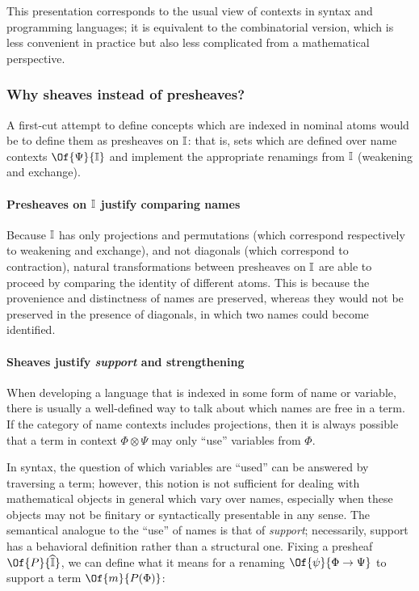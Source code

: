 \documentclass{article}
\newcommand\Psh[1]{\widehat{#1}}
\begin{document}
This presentation corresponds to the usual view of contexts in syntax
and programming languages; it is equivalent to the combinatorial
version, which is less convenient in practice but also less
complicated from a mathematical perspective.

\subsubsection{Why sheaves instead of presheaves?}

A first-cut attempt to define concepts which are indexed in nominal
atoms would be to define them as presheaves on $\mathbb{I}$: that
is, sets which are defined over name contexts $\Of{\Psi}{\CatI}$ and
implement the appropriate renamings from $\mathbb{I}$ (weakening and exchange).

\paragraph{Presheaves on $\mathbb{I}$ justify comparing names}
Because $\mathbb{I}$ has only projections and permutations (which
correspond respectively to weakening and exchange), and not diagonals
(which correspond to contraction), natural transformations between
presheaves on $\mathbb{I}$ are able to proceed by comparing the identity of
different atoms. This is because the provenience and distinctness of
names are preserved, whereas they would not be preserved in the
presence of diagonals, in which two names could become identified.

\paragraph{Sheaves justify \emph{support} and strengthening}

When developing a language that is indexed in some form of name
or variable, there is usually a well-defined way to talk about which
names are free in a term. If the category of name contexts
includes projections, then it is always possible that a term in
context $\Phi\otimes\Psi$ may only ``use'' variables from $\Phi$.

In syntax, the question of which variables are ``used'' can be
answered by traversing a term; however, this notion is not sufficient
for dealing with mathematical objects in general which vary over
names, especially when these objects may not be finitary or
  syntactically presentable in any sense.
%
The semantical analogue to the ``use'' of names is that of
\emph{support}; necessarily, support has a behavioral definition
rather than a structural one. Fixing a presheaf $\Of{P}{\Psh{\CatI}}$,
we can define what it means for a renaming $\Of{\psi}{\Phi\to\Psi}$ to
support a term $\Of{m}{P(\Phi)}$:
\end{document}
